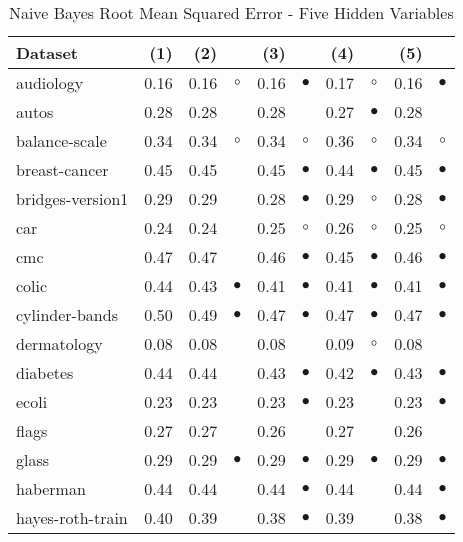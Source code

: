 \newpage
{\centering \footnotesize \begin{longtable}{lrr@{\hspace{0.1cm}}cr@{\hspace{0.1cm}}cr@{\hspace{0.1cm}}cr@{\hspace{0.1cm}}c}
\caption{\label{nbrmse5}Naive Bayes Root Mean Squared Error - Five Hidden Variables}
\\
\hline
Dataset & (1)& (2) & & (3) & & (4) & & (5) & \\
\hline
audiology & 0.16 & 0.16 &   $\circ$ & 0.16 & $\bullet$ & 0.17 &    $\circ$ & 0.16 & $\bullet$\\
autos & 0.28 & 0.28 &           & 0.28 &           & 0.27 &  $\bullet$ & 0.28 &          \\
balance-scale & 0.34 & 0.34 &   $\circ$ & 0.34 &   $\circ$ & 0.36 &    $\circ$ & 0.34 &   $\circ$\\
breast-cancer & 0.45 & 0.45 &           & 0.45 & $\bullet$ & 0.44 &  $\bullet$ & 0.45 & $\bullet$\\
bridges-version1 & 0.29 & 0.29 &           & 0.28 & $\bullet$ & 0.29 &    $\circ$ & 0.28 & $\bullet$\\
car & 0.24 & 0.24 &           & 0.25 &   $\circ$ & 0.26 &    $\circ$ & 0.25 &   $\circ$\\
cmc & 0.47 & 0.47 &           & 0.46 & $\bullet$ & 0.45 &  $\bullet$ & 0.46 & $\bullet$\\
colic & 0.44 & 0.43 & $\bullet$ & 0.41 & $\bullet$ & 0.41 &  $\bullet$ & 0.41 & $\bullet$\\
cylinder-bands & 0.50 & 0.49 & $\bullet$ & 0.47 & $\bullet$ & 0.47 &  $\bullet$ & 0.47 & $\bullet$\\
dermatology & 0.08 & 0.08 &           & 0.08 &           & 0.09 &    $\circ$ & 0.08 &          \\
diabetes & 0.44 & 0.44 &           & 0.43 & $\bullet$ & 0.42 &  $\bullet$ & 0.43 & $\bullet$\\
ecoli & 0.23 & 0.23 &           & 0.23 & $\bullet$ & 0.23 &            & 0.23 & $\bullet$\\
flags & 0.27 & 0.27 &           & 0.26 &           & 0.27 &            & 0.26 &          \\
glass & 0.29 & 0.29 & $\bullet$ & 0.29 & $\bullet$ & 0.29 &  $\bullet$ & 0.29 & $\bullet$\\
haberman & 0.44 & 0.44 &           & 0.44 & $\bullet$ & 0.44 &            & 0.44 & $\bullet$\\
hayes-roth-train & 0.40 & 0.39 &           & 0.38 & $\bullet$ & 0.39 &            & 0.38 & $\bullet$\\

\end{longtable}}
